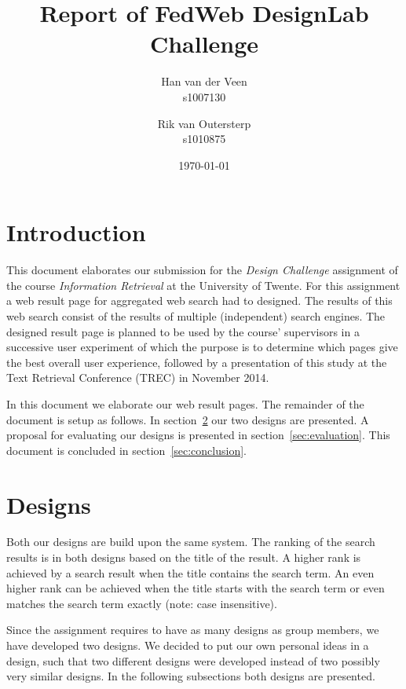 \documentclass[12pt]{article}
\title{Report of FedWeb DesignLab Challenge}
\author{
        Han van der Veen \\ s1007130
            \and
			Rik van Outersterp \\ s1010875
}
\date{\today}
\begin{document}
\maketitle


\section{Introduction}
This document elaborates our submission for the \textit{Design Challenge} assignment of the course \textit{Information Retrieval} at the University of Twente. 
For this assignment a web result page for aggregated web search had to designed.
The results of this web search consist of the results of multiple (independent) search engines.
The designed result page is planned to be used by the course' supervisors in a successive user experiment of which the purpose is to determine which pages give the best overall user experience, followed by a presentation of this study at the Text Retrieval Conference (TREC) in November 2014.

In this document we elaborate our web result pages.
The remainder of the document is setup as follows.
In section~\ref{sec:designs} our two designs are presented.
A proposal for evaluating our designs is presented in section~\ref{sec:evaluation}.
This document is concluded in section~\ref{sec:conclusion}.

\section{Designs}
\label{sec:designs}
Both our designs are build upon the same system.
The ranking of the search results is in both designs based on the title of the result.
A higher rank is achieved by a search result when the title contains the search term.
An even higher rank can be achieved when the title starts with the search term or even matches the search term exactly (note: case insensitive).

Since the assignment requires to have as many designs as group members, we have developed two designs.
We decided to put our own personal ideas in a design, such that two different designs were developed instead of two possibly very similar designs.
In the following subsections both designs are presented.
\end{document}
